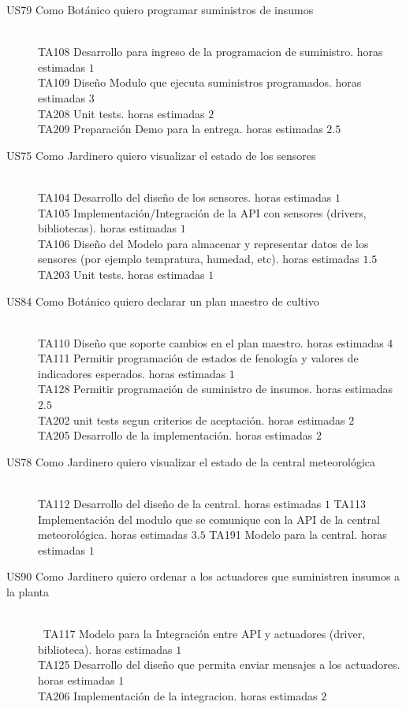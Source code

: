 \begin{description}
  \item[US79 Como Botánico quiero programar suministros de insumos] \hfill \\
  TA108	Desarrollo para ingreso de la programacion de suministro. horas estimadas $1$ \\
  TA109	Diseño Modulo que ejecuta suministros programados. horas estimadas $3$ \\
  TA208	Unit tests. horas estimadas $2$ \\
  TA209	Preparación Demo para la entrega. horas estimadas $2.5$
  \item[US75 Como Jardinero quiero visualizar el estado de los sensores] \hfill \\
	TA104	Desarrollo del diseño de los sensores. horas estimadas $1$ \\
	TA105	Implementación/Integración de la API con sensores (drivers, bibliotecas). horas estimadas $1$ \\
	TA106	Diseño del Modelo para almacenar y representar datos de los sensores (por ejemplo tempratura, humedad, etc). horas estimadas $1.5$ \\
	TA203	Unit tests. horas estimadas $1$ \\ 
  \item[US84 Como Botánico quiero declarar un plan maestro de cultivo] \hfill \\
  TA110	Diseño que soporte cambios en el plan maestro. horas estimadas $4$
  TA111	Permitir programación de estados de fenología y valores de indicadores esperados. horas estimadas $1$ \\
  TA128	Permitir programación de suministro de insumos. horas estimadas $2.5$ \\
  TA202	unit tests segun criterios de aceptación. horas estimadas $2$ \\
  TA205	Desarrollo de la implementación. horas estimadas $2$ \\
  \item[US78 Como Jardinero quiero visualizar el estado de la central meteorológica] \hfill \\
  TA112	Desarrollo del diseño de la central. horas estimadas $1$
  TA113	Implementación del modulo que se comunique con la API de la central meteorológica. horas estimadas $3.5$
  TA191	Modelo para la central. horas estimadas $1$
    \item[US90	Como Jardinero quiero ordenar a los actuadores que suministren insumos a la planta] \hfill \\\
    TA117	Modelo para la Integración entre API y actuadores (driver, biblioteca). horas estimadas $1$ \\
    TA125	Desarrollo del diseño que permita enviar mensajes a los actuadores. horas estimadas $1$ \\
    TA206	Implementación de la integracion. horas estimadas $2$ \\
  

\end{description}
